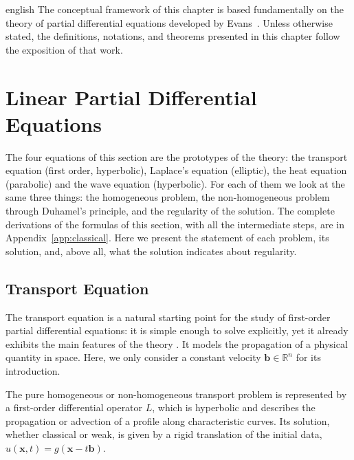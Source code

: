 \documentclass[11pt,letterpaper,twoside,openright]{book} %
\begin{document}
\begin{hyphenrules}{english}
The conceptual framework of this chapter is based fundamentally on the theory of partial differential
equations developed by Evans~\cite{evans2010}. Unless otherwise stated, the definitions, notations, and
theorems presented in this chapter follow the exposition of that work.

\section{Linear Partial Differential Equations}\label{sec:linear-pdes}

The four equations of this section are the prototypes of the theory: the transport equation (first
order, hyperbolic), Laplace's equation (elliptic), the heat equation (parabolic) and the wave equation
(hyperbolic). For each of them we look at the same three things: the homogeneous problem, the
non-homogeneous problem through Duhamel's principle, and the regularity of the solution.
The complete derivations of the formulas of this section, with all the intermediate steps, are in
Appendix~\ref{app:classical}. Here we present the statement of each problem, its solution, and, above all, what the solution indicates about regularity.

\subsection{Transport Equation}\label{subsec:transport}

The transport equation is a natural starting point for the study of first-order partial differential
equations: it is simple enough to solve explicitly, yet it already exhibits the main features of the
theory \cite{evans2010}. It models the propagation of a physical quantity in space. Here, we only
consider a constant velocity $\mathbf{b}\in\mathbb{R}^n$ for its introduction.

The pure homogeneous or non-homogeneous transport problem is represented by a first-order differential
operator $L$, which is hyperbolic and describes the propagation or advection of a profile along
characteristic curves. Its solution, whether classical or weak, is given by a rigid translation of the
initial data, $u(\mathbf{x},t)=g(\mathbf{x}-t\mathbf{b})$.


\end{hyphenrules}
\end{document}
